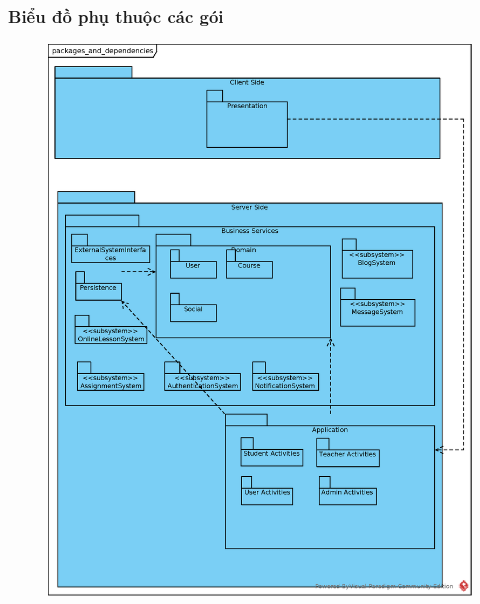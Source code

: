 \documentclass[./../main.tex]{subfiles}
\begin{document}
	\subsubsection{Biểu đồ phụ thuộc các gói}
	\begin{figure}[H]
		\centering
		\includegraphics[width=\linewidth]{./images/packages_and_dependencies.eps}
	\end{figure}
\end{document}
